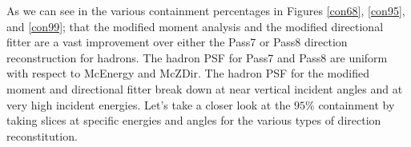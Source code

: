 \documentclass[11pt]{article}
\begin{document}
As we can see in the various containment percentages in Figures \ref{con68}, \ref{con95}, and \ref{con99};  that the modified moment analysis and the modified directional fitter are a vast improvement over either the Pass7 or Pass8 direction reconstruction for hadrons.  The hadron PSF for Pass7  and Pass8 are uniform with respect to McEnergy and McZDir.  The hadron PSF for the modified moment and directional fitter break down at near vertical incident angles and at very high incident energies.  Let's take a closer look at the $95\%$ containment by taking slices at specific energies and angles for the various types of direction reconstitution.  
\end{document}
